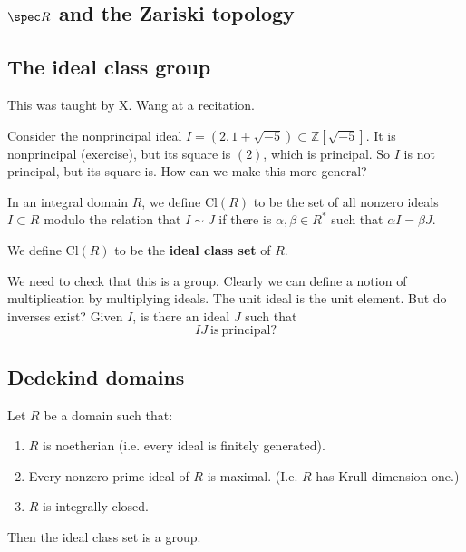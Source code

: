 

\subsection{$\spec R$ and the Zariski topology}


\subsection{The ideal class group}

This was taught by X. Wang at a recitation.

\begin{example} 
Consider the nonprincipal ideal $I=(2 , 1+\sqrt{-5}) \subset
\mathbb{Z}[\sqrt{-5}]$.  It is nonprincipal (exercise), but its square is
$(2)$, which is principal.  So $I$  is not principal, but its square is.  How
can we make this more general? 
\end{example} 

\newcommand{\cl}{\mathrm{Cl}}

In an integral domain $R$, we define $\cl(R)$ to be the set of all nonzero ideals $I
\subset R$ modulo the relation that $I \sim J$ if there is $\alpha, \beta \in
R^*$ such that $\alpha I = \beta J$.

\begin{definition} 
We define $\cl(R)$ to be the \textbf{ideal class set} of $R$.
\end{definition} 

We need to check that this is a group.
Clearly we can define a notion of multiplication by multiplying ideals. The
unit ideal is the unit element.  
But do inverses exist?  Given $I$, is there an ideal $J$ such that
\[ IJ \ \mathrm{is} \ \mathrm{principal?} \]

\subsection{Dedekind domains}
\begin{theorem} 
Let $R$ be a domain such that:
\begin{enumerate}
\item $R$ is noetherian (i.e. every ideal is finitely generated).
\item Every nonzero prime ideal of $R$ is maximal. (I.e. $R$ has Krull
dimension one.)
\item $R$ is integrally closed.
\end{enumerate}
Then the ideal class set is a group.  
\end{theorem} 

